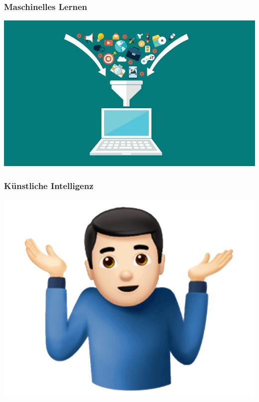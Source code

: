 \documentclass[aspectratio=169,xcolor=dvipsnames]{beamer}
\begin{document}
\begin{frame}
\frametitle{\glqq Maschinelles Lernen\grqq}
\begin{center}
\includegraphics[height=0.7\paperheight,keepaspectratio]{images/funnel} 
\end{center}
\end{frame}

\begin{frame}
\frametitle{\glqq Künstliche Intelligenz\grqq}
\pause

\begin{minipage}{0.5\paperwidth}
\begin{center}
\includegraphics[height=0.7\paperheight,keepaspectratio]{images/man-shrug} 
\end{center}
\end{minipage}\begin{minipage}{0.5\paperwidth}

\end{minipage}
\end{frame}
\end{document}
